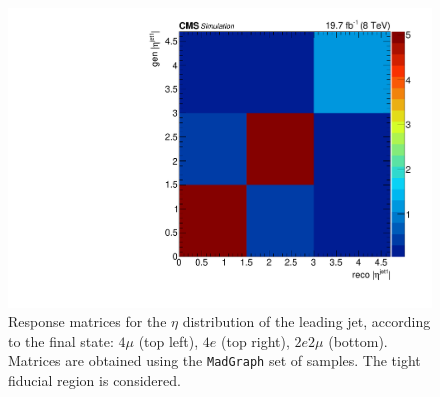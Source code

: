 \begin{figure}[hbtp]
\begin{center}
    \includegraphics[width=\cmsFigWidth]{Figures/ResMat_qqggJJ_EtaJet1_ZZTo2e2m_st_01_fr_Mad}     
    \caption{Response matrices for the $\eta$ distribution of the leading jet, according to the final state:  $4\mu$ (top left), $4e$ (top right), $2e2\mu$  (bottom). Matrices are obtained using the  \texttt{MadGraph} set of samples. The tight fiducial region is considered.} 
    \label{fig:EtaJet1_matrices}
  \end{center}
\end{figure}
